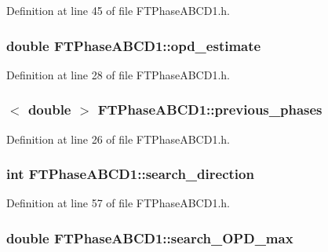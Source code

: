 Definition at line 45 of file FTPhaseABCD1.h.

\hypertarget{classFTPhaseABCD1_acc233644e0b0bfd0efdf31fda757fcce}{
\subsubsection[{opd\_\-estimate}]{\setlength{\rightskip}{0pt plus 5cm}double {\bf FTPhaseABCD1::opd\_\-estimate}}}
\label{classFTPhaseABCD1_acc233644e0b0bfd0efdf31fda757fcce}


Definition at line 28 of file FTPhaseABCD1.h.

\hypertarget{classFTPhaseABCD1_ac673e4c9a6b8139316509541e1044828}{
\subsubsection[{previous\_\-phases}]{$<$ double $>$ {\bf FTPhaseABCD1::previous\_\-phases}}}
\label{classFTPhaseABCD1_ac673e4c9a6b8139316509541e1044828}


Definition at line 26 of file FTPhaseABCD1.h.

\hypertarget{classFTPhaseABCD1_a41c864e9da51314cabe1f724a81f3d68}{
\subsubsection[{search\_\-direction}]{\setlength{\rightskip}{0pt plus 5cm}int {\bf FTPhaseABCD1::search\_\-direction}}}
\label{classFTPhaseABCD1_a41c864e9da51314cabe1f724a81f3d68}


Definition at line 57 of file FTPhaseABCD1.h.

\hypertarget{classFTPhaseABCD1_a7a04057b036f5caa88ea6d6e3661e309}{
\subsubsection[{search\_\-OPD\_\-max}]{\setlength{\rightskip}{0pt plus 5cm}double {\bf FTPhaseABCD1::search\_\-OPD\_\-max}}}
\label{classFTPhaseABCD1_a7a04057b036f5caa88ea6d6e3661e309}



